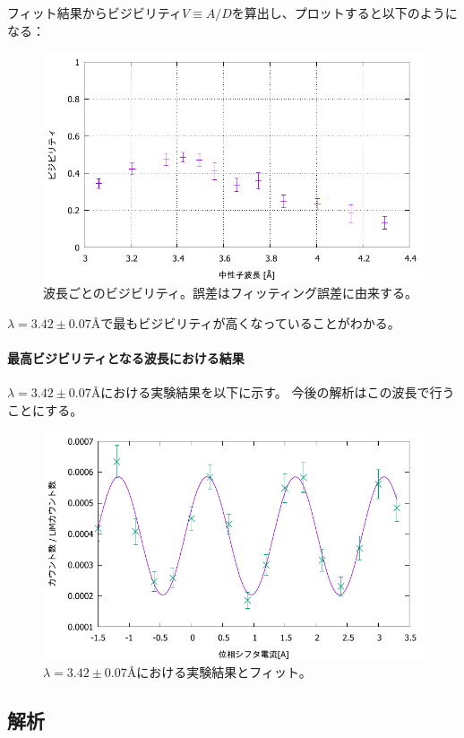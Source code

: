 フィット結果からビジビリティ$V\equiv A/D$を算出し、プロットすると以下のようになる：
\begin{figure}[H]
\centering
\includegraphics{phase_shifter/visibility.pdf}
\caption{波長ごとのビジビリティ。誤差はフィッティング誤差に由来する。}
\end{figure}

$\lambda=3.42\pm0.07$Åで最もビジビリティが高くなっていることがわかる。

\paragraph{最高ビジビリティとなる波長における結果}
$\lambda=3.42\pm0.07$Åにおける実験結果を以下に示す。
今後の解析はこの波長で行うことにする。
\begin{figure}[H]
\centering
\includegraphics{phase_shifter/fit.pdf}
\caption{$\lambda=3.42\pm0.07$Åにおける実験結果とフィット。\label{ps_fitresult}}
\end{figure}

\subsection{解析}
